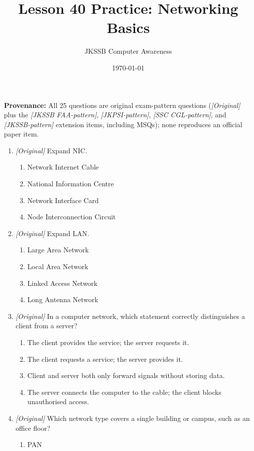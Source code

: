 \documentclass[11pt]{article}
\title{Lesson 40 Practice: Networking Basics}
\author{JKSSB Computer Awareness}
\date{\today}
\begin{document}
\maketitle
\noindent\textbf{Provenance:} All 25 questions are original exam-pattern questions (\textit{[Original]} plus the \textit{[JKSSB FAA-pattern]}, \textit{[JKPSI-pattern]}, \textit{[SSC CGL-pattern]}, and \textit{[JKSSB-pattern]} extension items, including MSQs); none reproduces an official paper item.

\begin{enumerate}[label=\textbf{Q\arabic*.}, leftmargin=*]
\item \textit{[Original]} Expand NIC.
  \begin{enumerate}[label=\Alph*.]
    \item Network Internet Cable
    \item National Information Centre
    \item Network Interface Card
    \item Node Interconnection Circuit
  \end{enumerate}
\item \textit{[Original]} Expand LAN.
  \begin{enumerate}[label=\Alph*.]
    \item Large Area Network
    \item Local Area Network
    \item Linked Access Network
    \item Long Antenna Network
  \end{enumerate}
\item \textit{[Original]} In a computer network, which statement correctly
  distinguishes a client from a server?
  \begin{enumerate}[label=\Alph*.]
    \item The client provides the service; the server requests it.
    \item The client requests a service; the server provides it.
    \item Client and server both only forward signals without storing data.
    \item The server connects the computer to the cable; the client blocks
      unauthorised access.
  \end{enumerate}
\item \textit{[Original]} Which network type covers a single building or
  campus, such as an office floor?
  \begin{enumerate}[label=\Alph*.]
    \item PAN

\end{enumerate}
\end{enumerate}
\end{document}
